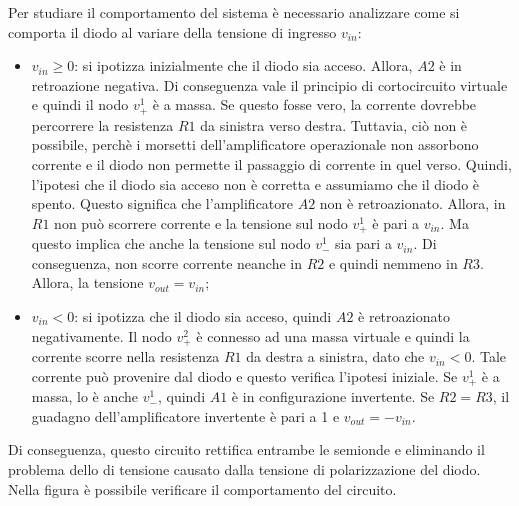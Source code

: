 \noindent
Per studiare il comportamento del sistema è necessario analizzare come si comporta il diodo al variare della tensione di ingresso $v_{in}$:
\begin{itemize}
	\item $v_{in} \geq 0$: si ipotizza inizialmente che il diodo sia acceso. Allora, $A2$  è in retroazione negativa. Di conseguenza vale il principio di cortocircuito virtuale e quindi il nodo $v_{+}^1$  è a massa. Se questo fosse vero, la corrente dovrebbe percorrere la resistenza $R1$ da sinistra verso destra. Tuttavia, ciò non è possibile, perchè i morsetti dell'amplificatore operazionale non assorbono corrente e il diodo non permette il passaggio di corrente in quel verso. Quindi, l'ipotesi che il diodo sia acceso non è corretta e assumiamo che il diodo è spento. Questo significa che l'amplificatore $A2$ non è retroazionato. Allora, in $R1$ non può scorrere corrente e la tensione sul nodo $v_{+}^1$ è pari a $v_{in}$. Ma questo implica che anche la tensione sul nodo $v_{-}^1$ sia pari a $v_{in}$. Di conseguenza, non scorre corrente neanche in $R2$ e quindi nemmeno in $R3$. Allora, la tensione $v_{out} = v_{in}$;
	\item $v_{in} < 0$: si ipotizza che il diodo sia acceso, quindi $A2$ è retroazionato negativamente. Il nodo $v_{+}^2$ è connesso ad una massa virtuale e quindi la corrente scorre nella resistenza $R1$ da destra a sinistra, dato che $v_{in} < 0$. Tale corrente può provenire dal diodo e questo verifica l'ipotesi iniziale. Se $v_{+}^1$ è a massa, lo è anche $v_{-}^1$, quindi $A1$ è in configurazione invertente. Se $R2 = R3$, il guadagno dell'amplificatore invertente è pari a 1 e $v_{out} = -v_{in}$.
\end{itemize}
Di conseguenza, questo circuito rettifica entrambe le semionde e eliminando il problema dello  di tensione causato dalla tensione di polarizzazione del diodo. Nella figura  è possibile verificare il comportamento del circuito.


